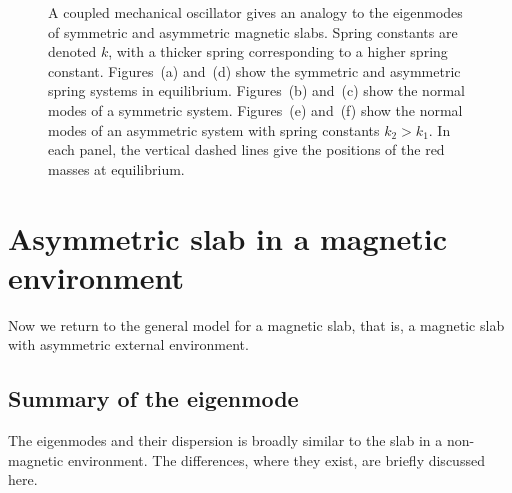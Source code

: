 \documentclass[12pt]{../style-files/ociamthesis}
\begin{document}
\begin{figure}
{{{
			\label{fig: springs asym anti-phase}}}}

	\caption{A coupled mechanical oscillator gives an analogy to the eigenmodes of symmetric and asymmetric magnetic slabs. Spring constants are denoted $k$, with a thicker spring corresponding to a higher spring constant. Figures~(a) and~(d) show the symmetric and asymmetric spring systems in equilibrium. Figures~(b) and~(c) show the normal modes of a symmetric system. Figures~(e) and~(f) show the normal modes of an asymmetric system with spring constants $k_2 > k_1$. In each panel, the vertical dashed lines give the positions of the red masses at equilibrium.}
	\label{fig: springs all}
\end{figure}


\section{Asymmetric slab in a magnetic environment}
\label{sec: EVP mag}

Now we return to the general model for a magnetic slab, that is, a magnetic slab with asymmetric external environment.

\subsection{Summary of the eigenmode}

The eigenmodes and their dispersion is broadly similar to the slab in a non-magnetic environment. The differences, where they exist, are briefly discussed here.
\end{document}

